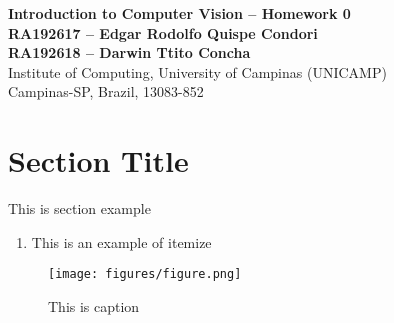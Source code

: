 \documentclass[10pt, a4paper]{article}
\begin{document}
\begin{center}

\textbf{Introduction to Computer Vision -- Homework 0} \\[0.1cm]

\textbf{RA192617 -- Edgar Rodolfo Quispe Condori} \\[0.1cm]
\textbf{RA192618 -- Darwin Ttito Concha} \\[0.1cm]

Institute of Computing, University of Campinas (UNICAMP) \\
Campinas-SP, Brazil, 13083-852 \\
\end{center}

\section{Section Title}

This is section example

\begin{enumerate}[label=(\roman*)]
\setlength\itemsep{-0.02cm}
\item This is an example of itemize
\end{enumerate}


\begin{figure}[!htb]
\centering
\texttt{[image: figures/figure.png]}
\caption{This is caption}
\label{fig:figname}
\end{figure}

\fi
\end{document}

